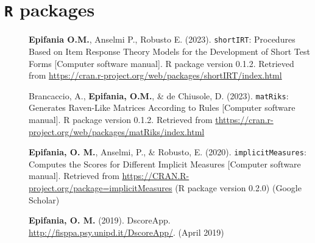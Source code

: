 \documentclass[letterpaper,12pt]{article}
\begin{document}

\section{\texttt{R} packages}
\begin{description}
	\item[] \textbf{Epifania O.M.}, Anselmi P., Robusto E. (2023). \texttt{shortIRT}: Procedures Based on Item Response Theory Models for the
	Development of Short Test Forms [Computer software manual]. R package version 0.1.2. Retrieved from \href{https://cran.r-project.org/web/packages/shortIRT/index.html}{https://cran.r-project.org/web/packages/shortIRT/index.html}
	
	\item[] Brancaccio, A., \textbf{Epifania, O.M.}, \& de Chiusole, D. (2023). \texttt{matRiks}: Generates Raven-Like Matrices According to Rules [Computer software manual]. R package version 0.1.2. Retrieved from \href{https://cran.r-project.org/web/packages/matRiks/index.html}{thttps://cran.r-project.org/web/packages/matRiks/index.html}
	
	\item[] \textbf{Epifania, O. M.}, Anselmi, P., \& Robusto, E. (2020). \texttt{implicitMeasures}: Computes the Scores for Different Implicit Measures [Computer software manual]. Retrieved from
	\href{https://CRAN.R-project.org/package=implicitMeasures}{https://CRAN.R-project.org/package=implicitMeasures} (R package version 0.2.0) (Google Scholar)
	
	
	\item[] \textbf{Epifania, O. M.} (2019). DscoreApp. \href{http://fisppa.psy.unipd.it/DscoreApp/}{http://fisppa.psy.unipd.it/DscoreApp/}.  (April 2019)
\end{description}
\end{document}

